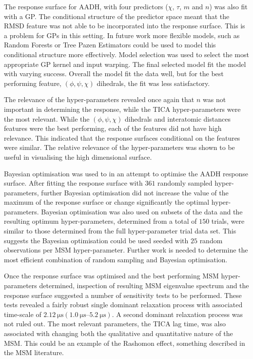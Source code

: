 The response surface for AADH, with four predictors ($\chi$, $\tau$, $m$ and $n$) was also fit with a GP. The conditional structure of the predictor space meant that the RMSD feature was not able to be incorporated into the response surface. This is a problem for GPs in this setting. In future work more flexible models, such as Random Forests or Tree Pazen Estimators could be used to model this conditional structure more effectively. Model selection was used to select the most appropriate GP kernel and input warping. The final selected model fit the model with varying success. Overall the model fit the data well, but for the best performing feature, $(\phi, \psi, \chi)$ dihedrals, the fit was less satisfactory. 

The relevance of the hyper-parameters revealed once again that $n$ was not important in determining the response, while the TICA hyper-parameters were the most relevant. While the $(\phi, \psi, \chi)$ dihedrals and interatomic distances features were the best performing, each of the features did not have high relevance. This indicated that the response surfaces conditional on the features were similar.  The relative relevance of the hyper-parameters was shown to be useful in visualising the high dimensional surface.

Bayesian optimisation was used to in an attempt to optimise the AADH response surface. After fitting the response surface with $361$ randomly sampled hyper-parameters, further Bayesian optimisation did not increase the value of the maximum of the response surface or change significantly the optimal hyper-parameters. Bayesian optimisation was also used on subsets of the data and the resulting optimum hyper-parameters, determined from a total of $150$ trials, were similar to those determined from the full hyper-parameter trial data set. This suggests the Bayesian optimisation could be used seeded with $25$ random observations per MSM hyper-parameter. Further work is needed to determine the most efficient combination of random sampling and Bayesian optimisation. 

Once the response surface was optimised and the best performing MSM hyper-parameters determined,  inspection of resulting MSM eigenvalue spectrum and the response surface suggested a number of sensitivity tests to be performed.  These tests revealed a fairly robust single dominant relaxation process with associated time-scale of $\SI{2.12}{\micro\second} (\SIrange{1.0}{5.2}{\micro\second})$. A second dominant relaxation process was not ruled out. The most relevant parameters, the TICA lag time, was also associated with changing both the qualitative and quantitative nature of the MSM. This could be an example of the Rashomon effect, something described in the MSM literature. 


